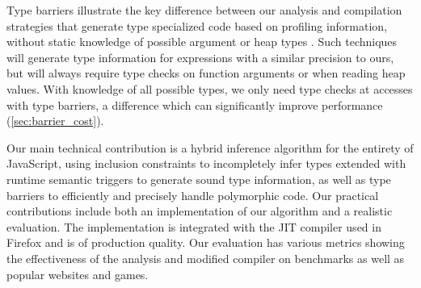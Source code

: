 Type barriers illustrate the key difference between our analysis and
compilation strategies that generate type specialized code based on profiling
information, without static knowledge of possible argument or heap types
\cite{ChambersThesis, OtherStuff}.
Such techniques will generate type information for expressions with a
similar precision to ours,
but will always require type checks on function arguments or when reading
heap values.
With knowledge of all possible types, we only need type checks at accesses
with type barriers, a difference which can significantly improve performance
(\Section\ref{sec:barrier_cost}).

Our main technical contribution is a hybrid inference algorithm for the
entirety of JavaScript, using inclusion constraints to incompletely infer
types extended with runtime semantic triggers to generate sound type
information, as well as type barriers to efficiently and precisely handle
polymorphic code. Our practical contributions include both an
implementation of our algorithm and a realistic evaluation. The implementation
is integrated with the JIT compiler used in Firefox and is of production
quality. Our evaluation has various metrics showing the effectiveness of the
analysis and modified compiler on benchmarks as well as popular websites and games.







